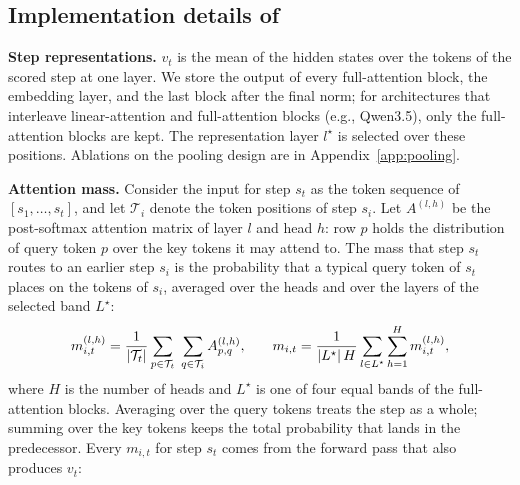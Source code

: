 \subsection{Implementation details of \soap{}}
\label{app:implementation}

\textbf{Step representations.}
$v_t$ is the mean of the hidden states over the tokens of the scored step at one layer. We store the output of every full-attention block, the embedding layer, and the last block after the final norm; for architectures that interleave linear-attention and full-attention blocks (e.g., Qwen3.5), only the full-attention blocks are kept. The representation layer $l^\star$ is selected over these positions. Ablations on the pooling design are in Appendix~\ref{app:pooling}.





\textbf{Attention mass.}
Consider the input for step $s_t$ as the token sequence of $[s_1,\ldots,s_t]$, and let $\mathcal{T}_i$ denote the token positions of step $s_i$. Let $A^{(l,h)}$ be the post-softmax attention matrix of layer $l$ and head $h$: row $p$ holds the distribution of query token $p$ over the key tokens it may attend to. The mass that step $s_t$ routes to an earlier step $s_i$ is the probability that a typical query token of $s_t$ places on the tokens of $s_i$, averaged over the heads and over the layers of the selected band $L^\star$:
\begin{equation}
\small
    m^{(l,h)}_{i,t}
    =
    \frac{1}{|\mathcal{T}_t|}
    \sum_{p\in\mathcal{T}_t}\;\sum_{q\in\mathcal{T}_i}
    A^{(l,h)}_{p,q},
    \qquad
    m_{i,t}
    =
    \frac{1}{|L^\star|\,H}
    \sum_{l\in L^\star}\sum_{h=1}^{H}
    m^{(l,h)}_{i,t},
    \label{eq:attn-mass}
\end{equation}
where $H$ is the number of heads and  $L^\star$ is one of four equal bands of the full-attention blocks. Averaging over the query tokens treats the step as
a whole; summing over the key tokens keeps the total probability that lands in the
predecessor. Every $m_{i,t}$ for step $s_t$ comes from the forward pass that also
produces $v_t$:

